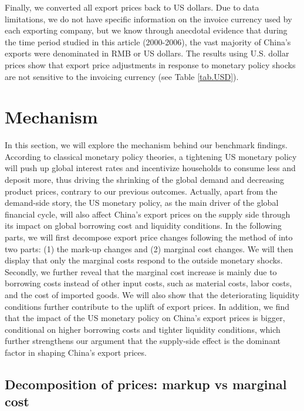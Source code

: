 Finally, we converted all export prices back to US dollars. Due to data limitations, we do not have specific information on the invoice currency used by each exporting company, but we know through anecdotal evidence that during the time period studied in this article (2000-2006), the vast majority of China's exports were denominated in RMB or US dollars. The results using U.S. dollar prices show that export price adjustments in response to monetary policy shocks are not sensitive to the invoicing currency (see Table \ref{tab.USD}).


\section{Mechanism}

In this section, we will explore the mechanism behind our benchmark findings. According to classical monetary policy theories, a tightening US monetary policy will push up global interest rates and incentivize households to consume less and deposit more, thus driving the shrinking of the global demand and decreasing product prices, contrary to our previous outcomes. Actually, apart from the demand-side story, the US monetary policy, as the main driver of the global financial cycle, will also affect China's export prices on the supply side through its impact on global borrowing cost and liquidity conditions. In the following parts, we will first decompose export price changes following the method of \cite{deloecker2012markups}into two parts: (1) the mark-up changes and (2) marginal cost changes. We will then display that only the marginal costs respond to the outside monetary shocks. Secondly, we further reveal that the marginal cost increase is mainly due to borrowing costs instead of other input costs, such as material costs, labor costs, and the cost of imported goods. We will also show that the deteriorating liquidity conditions further contribute to the uplift of export prices. In addition, we find that the impact of the US monetary policy on China's export prices is bigger, conditional on higher borrowing costs and tighter liquidity conditions, which further strengthens our argument that the supply-side effect is the dominant factor in shaping China's export prices.

\subsection{Decomposition of prices: markup vs marginal cost}

